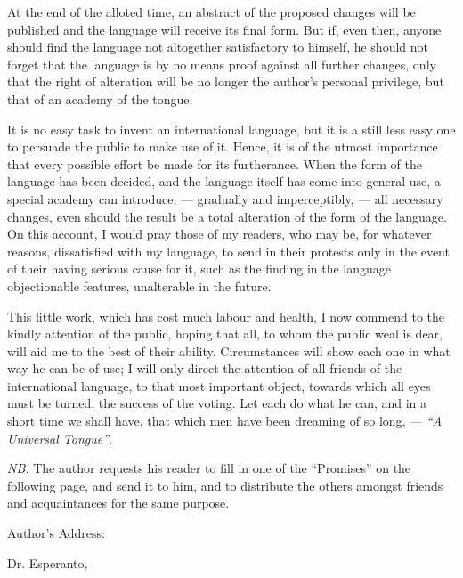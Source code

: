 \documentclass[12pt,twoside]{book}
\begin{document}
At the end of the alloted time, an abstract of the proposed changes will be published and the language will receive its final form. But if, even then, anyone should find the language not altogether satisfactory to himself, he should not forget that the language is by no means proof against all further changes, only that the right of alteration will be no longer the author’s personal privilege, but that of an academy of the tongue.

It is no easy task to invent an international language, but it is a still less easy one to persuade the public to make use of it. Hence, it is of the utmost importance that every possible effort be made for its furtherance. When the form of the language has been decided, and the language itself has come into general use, a special academy can introduce, --- gradually and imperceptibly, --- all necessary changes, even should the result be a total alteration of the form of the language. On this account, I would pray those of my readers, who may be, for whatever reasons, dissatisfied with my language, to send in their protests only in the event of their having serious cause for it, such as the finding in the language objectionable features, unalterable in the future.

This little work, which has cost much labour and health, I now commend to the kindly attention of the public, hoping that all, to whom the public weal is dear, will aid me to the best of their ability. Circumstances will show each one in what way he can be of use; I will only direct the attention of all friends of the international language, to that most important object, towards which all eyes must be turned, the success of the voting. Let each do what he can, and in a short time we shall have, that which men have been dreaming of so long, --- \emph{``A Universal Tongue''}.

\sectionline

\newpage

\emph{NB.} The author requests his reader to fill in one of the ``Promises'' on the following page, and send it to him, and to distribute the others amongst friends and acquaintances for the same purpose.

Author's Address:

\vspace{1ex}

\hspace{1.5em} Dr. Esperanto,

\vspace{1ex}
\end{document}
